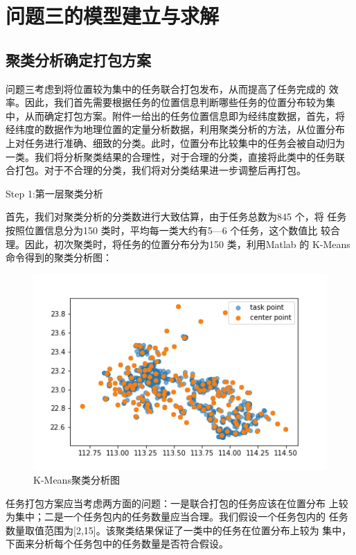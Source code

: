 \section{问题三的模型建立与求解}
\subsection{聚类分析确定打包方案}
问题三考虑到将位置较为集中的任务联合打包发布，从而提高了任务完成的
效率。因此，我们首先需要根据任务的位置信息判断哪些任务的位置分布较为集
中，从而确定打包方案。附件一给出的任务位置信息即为经纬度数据，首先，将
经纬度的数据作为地理位置的定量分析数据，利用聚类分析的方法，从位置分布
上对任务进行准确、细致的分类。此时，位置分布比较集中的任务会被自动归为
一类。我们将分析聚类结果的合理性，对于合理的分类，直接将此类中的任务联
合打包。对于不合理的分类，我们将对分类结果进一步调整后再打包。

Step 1:第一层聚类分析

首先，我们对聚类分析的分类数进行大致估算，由于任务总数为845 个，将
任务按照位置信息分为150 类时，平均每一类大约有5—6 个任务，这个数值比
较合理。因此，初次聚类时，将任务的位置分布分为150 类，利用Matlab 的
K-Means 命令得到的聚类分析图：

\begin{figure}[H]
    \centering
    \includegraphics[width=1\textwidth]{150.png}
    \caption{K-Means聚类分析图}
    \label{}
\end{figure}

任务打包方案应当考虑两方面的问题：一是联合打包的任务应该在位置分布
上较为集中；二是一个任务包内的任务数量应当合理。我们假设一个任务包内的
任务数量取值范围为[2,15]。该聚类结果保证了一类中的任务在位置分布上较为
集中，下面来分析每个任务包中的任务数量是否符合假设。

